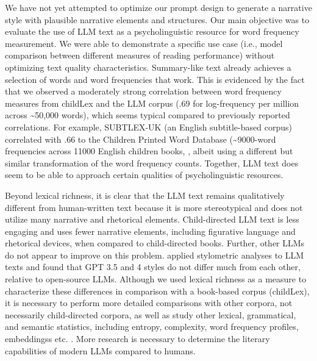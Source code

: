 \documentclass[doc, a4paper]{apa7}
\begin{document}
We have not yet attempted to optimize our prompt design to generate a narrative style with plausible narrative elements and structures. Our main objective was to evaluate the use of LLM text as a psycholinguistic resource for word frequency measurement. We were able to demonstrate a specific use case (i.e., model comparison between different measures of reading performance) without optimizing text quality characteristics. Summary-like text already achieves a selection of words and word frequencies that work. This is evidenced by the fact that we observed a moderately strong correlation between word frequency measures from childLex and the LLM corpus (.69 for log-frequency per million across \textasciitilde 50,000 words), which seems typical compared to previously reported correlations. For example, SUBTLEX-UK (an English subtitle-based corpus) correlated with .66 to the Children Printed Word Database (\textasciitilde 9000-word frequencies across 11000 English children books, \citep{van_heuven_subtlex-uk_2014}, albeit using a different but similar transformation of the word frequency counts. Together, LLM text does seem to be able to approach certain qualities of psycholinguistic resources. 

Beyond lexical richness, it is clear that the LLM text remains qualitatively different from human-written text because it is more stereotypical and does not utilize many narrative and rhetorical elements. Child-directed LLM text is less engaging and uses fewer narrative elements, including figurative language and rhetorical devices, when compared to child-directed books. Further, other LLMs do not appear to improve on this problem. \citet{kumarage_neural_2023} applied stylometric analyses to LLM texts and found that GPT 3.5 and 4 styles do not differ much from each other, relative to open-source LLMs. Although we used lexical richness as a measure to characterize these differences in comparison with a book-based corpus (childLex), it is necessary to perform more detailed comparisons with other corpora, not necessarily child-directed corpora, as well as study other lexical, grammatical, and semantic statistics, including entropy, complexity, word frequency profiles, embeddingss etc. \citep{hu_language_2024, dentella_systematic_2023, munoz-ortiz_contrasting_2024, wu_survey_2024}. More research is necessary to determine the literary capabilities of modern LLMs compared to humans. 
\end{document}
